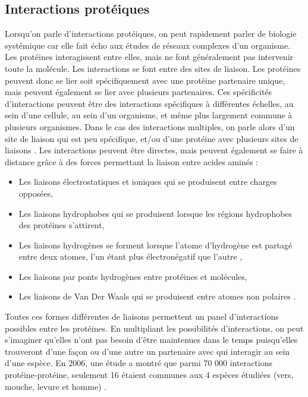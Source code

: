 \subsection{Interactions protéiques} \label{intprot}
\par Lorsqu’on parle d’interactions protéiques, on peut rapidement parler de biologie systémique car elle fait écho aux études de réseaux complexes d’un organisme. Les protéines interagissent entre elles, mais ne font généralement pas intervenir toute la molécule. Les interactions se font entre des sites de liaison. Les protéines peuvent donc se lier soit spécifiquement avec une protéine partenaire unique, mais peuvent également se lier avec plusieurs partenaires. Ces spécificités d’interactions peuvent être des interactions spécifiques à différentes échelles, au sein d’une cellule, au sein d’un organisme, et même plus largement commune à plusieurs organismes. Dans le cas des interactions multiples, on parle alors d’un site de liaison qui est peu spécifique, et/ou d’une protéine avec plusieurs sites de liaisons \parencite{di_lullo_mapping_2002}. Les interactions peuvent être directes, mais peuvent également se faire à distance grâce à des forces permettant la liaison entre acides aminés : 
\begin{itemize}
    \item Les liaisons électrostatiques et ioniques qui se produisent entre charges opposées,
    \item Les liaisons hydrophobes qui se produisent lorsque les régions hydrophobes des protéines s’attirent, 
    \item Les liaisons hydrogènes se forment lorsque l'atome d'hydrogène est partagé entre deux atomes, l'un étant plus électronégatif que l'autre  \parencite{bondar_hydrogen_2012},
    \item Les liaisons par ponts hydrogènes entre protéines et molécules, 
    \item Les liaisons de Van Der Waals qui se produisent entre atomes non polaires \parencite{van_oss_role_1986}.
\end{itemize}
\par Toutes ces formes différentes de liaisons permettent un panel d’interactions possibles entre les protéines. En multipliant les possibilités d’interactions, on peut s’imaginer qu’elles n’ont pas besoin d’être maintenues dans le temps puisqu’elles trouveront d’une façon ou d’une autre un partenaire avec qui interagir au sein d’une espèce. En 2006, une étude a montré que parmi 70 000 interactions protéine-protéine, seulement 16 étaient communes aux 4 espèces étudiées (vers, mouche, levure et homme) \parencite{gandhi_analysis_2006}. 

